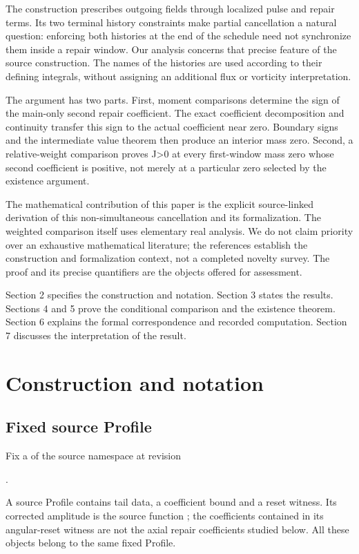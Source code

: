 \documentclass[11pt,a4paper]{article}
\begin{document}
The construction prescribes outgoing fields through localized pulse and repair terms. Its two terminal history constraints make partial cancellation a natural question: enforcing both histories at the end of the schedule need not synchronize them inside a repair window. Our analysis concerns that precise feature of the source construction. The names of the histories are used according to their defining integrals, without assigning an additional flux or vorticity interpretation.

The argument has two parts. First, moment comparisons determine the sign of the main-only second repair coefficient. The exact coefficient decomposition and continuity transfer this sign to the actual coefficient near zero. Boundary signs and the intermediate value theorem then produce an interior mass zero. Second, a relative-weight comparison proves J>0 at every first-window mass zero whose second coefficient is positive, not merely at a particular zero selected by the existence argument.

The mathematical contribution of this paper is the explicit source-linked derivation of this non-simultaneous cancellation and its formalization. The weighted comparison itself uses elementary real analysis. We do not claim priority over an exhaustive mathematical literature; the references establish the construction and formalization context, not a completed novelty survey. The proof and its precise quantifiers are the objects offered for assessment.

Section 2 specifies the construction and notation. Section 3 states the results. Sections 4 and 5 prove the conditional comparison and the existence theorem. Section 6 explains the formal correspondence and recorded computation. Section 7 discusses the interpretation of the result.

\section{Construction and notation}

\subsection{Fixed source Profile}

Fix a  of the source  namespace at revision

.

A source Profile contains tail data, a coefficient bound and a reset witness. Its corrected amplitude is the source function ; the coefficients contained in its angular-reset witness are not the axial repair coefficients studied below. All these objects belong to the same fixed Profile.
\end{document}
